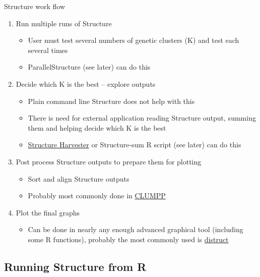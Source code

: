 \documentclass[compress, ucs, xelatex, 11pt, xcolor=svgnames,
  hyperref={
    bookmarks=true,
    unicode=true,
    colorlinks=true,
    pdftitle={Molecular data in R},
    plainpages=false,
    pdfauthor={Vojtech Zeisek},
    pdfsubject={Course about phylogeny and evolution in R},
    pdfcreator={XeLaTeX},
    pdfkeywords={R, evolution, phylogeny, molecular data},
    linkcolor=Tomato,
    anchorcolor=SaddleBrown,
    citecolor=Goldenrod,
    filecolor=DarkMagenta,
    menucolor=Sienna,
    urlcolor=DarkTurquoise,
    pdftex},
  url={hyphens, lowtilde} %
  ]{beamer}
\begin{document}
\begin{frame}{Structure work flow}
  \begin{enumerate}
    \item Run multiple runs of Structure
    \begin{itemize}
      \item User must test several numbers of genetic clusters (K) and test each several times
      \item ParallelStructure (see later) can do this
    \end{itemize}
    \item Decide which K is the best -- explore outputs
    \begin{itemize}
      \item Plain command line Structure does not help with this
      \item There is need for external application reading Structure output, summing them and helping decide which K is the best
      \item \href{http://taylor0.biology.ucla.edu/structureHarvester/}{Structure Harvester} or Structure-sum R script (see later) can do this
    \end{itemize}
    \item Post process Structure outputs to prepare them for plotting
    \begin{itemize}
      \item Sort and align Structure outputs
      \item Probably most commonly done in \href{https://web.stanford.edu/group/rosenberglab/clumpp.html}{CLUMPP}
    \end{itemize}
    \item Plot the final graphs
    \begin{itemize}
      \item Can be done in nearly any enough advanced graphical tool (including some R functions), probably the most commonly used is \href{https://web.stanford.edu/group/rosenberglab/distruct.html}{distruct}
    \end{itemize}
  \end{enumerate}
\end{frame}

\subsection{Running Structure from R}
\end{document}
